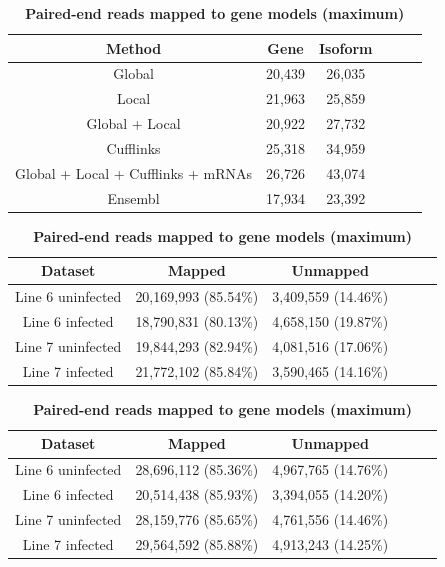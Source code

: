 \documentclass[10pt]{article}
\begin{document}
\begin{table}[!ht]
\caption{
\bf{Number of putative genes and isoforms}}
\begin{tabular}{cccccc}
\hline
Method& Gene & Isoform \\ 
\hline
Global & 20,439 & 26,035 \\
Local & 21,963 & 25,859 \\
Global + Local & 20,922 & 27,732 \\
Cufflinks & 25,318 & 34,959 \\
Global + Local + Cufflinks + mRNAs & 26,726 & 43,074\\
Ensembl & 17,934 & 23,392 \\
\hline
\end{tabular}
\label{genes_transcripts}

\caption{
\bf{Single-end reads mapped to gene models (maximum)}}
\begin{tabular}{cccccc}
\hline
Dataset & Mapped & Unmapped \\
\hline
Line 6 uninfected & 20,169,993 (85.54\%) & 3,409,559 (14.46\%) \\
Line 6 infected & 18,790,831 (80.13\%) & 4,658,150 (19.87\%) \\
Line 7 uninfected & 19,844,293 (82.94\%) & 4,081,516 (17.06\%) \\
Line 7 infected & 21,772,102 (85.84\%) & 3,590,465 (14.16\%) \\
\hline
\end{tabular}
\label{single-end_map}

\caption{
\bf{Paired-end reads mapped to gene models (maximum)}}
\begin{tabular}{cccccc}
\hline
Dataset & Mapped & Unmapped \\
\hline
Line 6 uninfected & 28,696,112 (85.36\%) & 4,967,765 (14.76\%) \\
Line 6 infected & 20,514,438 (85.93\%) & 3,394,055 (14.20\%) \\
Line 7 uninfected & 28,159,776 (85.65\%) & 4,761,556 (14.46\%) \\
Line 7 infected & 29,564,592 (85.88\%) & 4,913,243 (14.25\%) \\
\hline
\end{tabular}
\label{paired-end_map}
\end{table}
\end{document}
